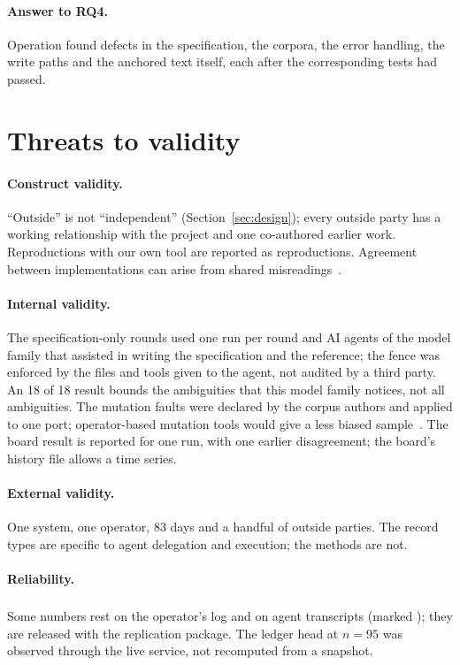 \documentclass[11pt,a4paper]{article}
\newcommand{\priv}{\textsuperscript{\textdagger}}
\begin{document}
\paragraph{Answer to RQ4.} Operation found defects in the specification, the corpora, the error handling, the write paths and the anchored text itself, each after the corresponding tests had passed.

\section{Threats to validity}\label{sec:threats}

\paragraph{Construct validity.} ``Outside'' is not ``independent'' (Section~\ref{sec:design}); every outside party has a working relationship with the project and one co-authored earlier work. Reproductions with our own tool are reported as reproductions. Agreement between implementations can arise from shared misreadings~\citep{knight1986}.

\paragraph{Internal validity.} The specification-only rounds used one run per round and AI agents of the model family that assisted in writing the specification and the reference; the fence was enforced by the files and tools given to the agent, not audited by a third party. An 18 of 18 result bounds the ambiguities that this model family notices, not all ambiguities. The mutation faults were declared by the corpus authors and applied to one port; operator-based mutation tools would give a less biased sample~\citep{just2014}. The board result is reported for one run, with one earlier disagreement; the board's history file allows a time series.

\paragraph{External validity.} One system, one operator, 83 days and a handful of outside parties. The record types are specific to agent delegation and execution; the methods are not.

\paragraph{Reliability.} Some numbers rest on the operator's log and on agent transcripts (marked \priv); they are released with the replication package. The ledger head at $n=95$ was observed through the live service, not recomputed from a snapshot.
\end{document}
